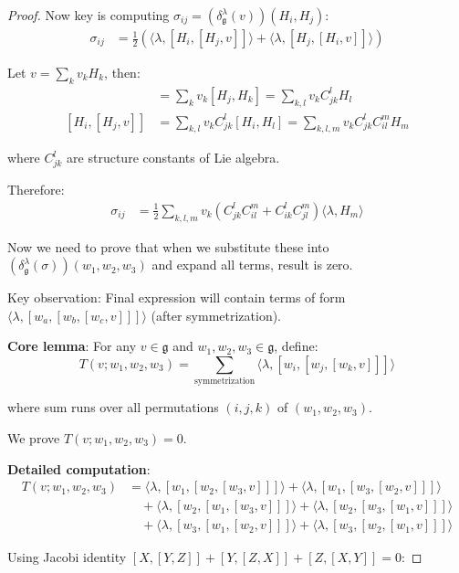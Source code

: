 \documentclass[10pt,a4paper]{amsart}
\begin{document}
\begin{proof}
Now key is computing $\sigma_{ij} = (\delta^\lambda_\mathfrak{g}(v))(H_i, H_j)$:
\begin{align}
\sigma_{ij} &= \frac{1}{2} \left( \langle \lambda, [H_i, [H_j, v]] \rangle + \langle \lambda, [H_j, [H_i, v]] \rangle \right)
\end{align}

Let $v = \sum_k v_k H_k$, then:
\begin{align}
[H_j, v] &= \sum_k v_k [H_j, H_k] = \sum_{k,l} v_k C_{jk}^l H_l \\
[H_i, [H_j, v]] &= \sum_{k,l} v_k C_{jk}^l [H_i, H_l] = \sum_{k,l,m} v_k C_{jk}^l C_{il}^m H_m
\end{align}

where $C_{jk}^l$ are structure constants of Lie algebra.

Therefore:
\begin{align}
\sigma_{ij} &= \frac{1}{2} \sum_{k,l,m} v_k \left( C_{jk}^l C_{il}^m + C_{ik}^l C_{jl}^m \right) \langle \lambda, H_m \rangle
\end{align}

Now we need to prove that when we substitute these into $(\delta^\lambda_\mathfrak{g}(\sigma))(w_1, w_2, w_3)$ and expand all terms, result is zero.

Key observation: Final expression will contain terms of form $\langle \lambda, [w_a, [w_b, [w_c, v]]] \rangle$ (after symmetrization).

\textbf{Core lemma}: For any $v \in \mathfrak{g}$ and $w_1, w_2, w_3 \in \mathfrak{g}$, define:
$$T(v; w_1, w_2, w_3) = \sum_{\text{symmetrization}} \langle \lambda, [w_i, [w_j, [w_k, v]]] \rangle$$

where sum runs over all permutations $(i,j,k)$ of $(w_1, w_2, w_3)$.

We prove $T(v; w_1, w_2, w_3) = 0$.

\textbf{Detailed computation}:
\begin{align}
T(v; w_1, w_2, w_3) &= \langle \lambda, [w_1, [w_2, [w_3, v]]] \rangle + \langle \lambda, [w_1, [w_3, [w_2, v]]] \rangle \\
&\quad + \langle \lambda, [w_2, [w_1, [w_3, v]]] \rangle + \langle \lambda, [w_2, [w_3, [w_1, v]]] \rangle \\
&\quad + \langle \lambda, [w_3, [w_1, [w_2, v]]] \rangle + \langle \lambda, [w_3, [w_2, [w_1, v]]] \rangle
\end{align}

Using Jacobi identity $[X, [Y, Z]] + [Y, [Z, X]] + [Z, [X, Y]] = 0$:


\end{proof}
\end{document}
